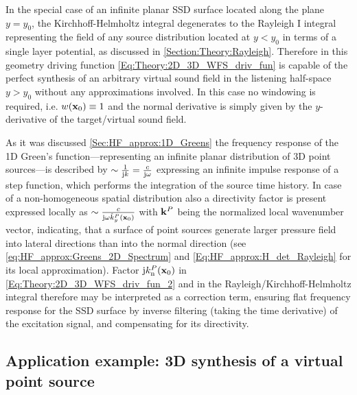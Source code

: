 \vspace{3mm}
In the special case of an infinite planar SSD surface located along the plane $y = y_0$, the Kirchhoff-Helmholtz integral degenerates to the Rayleigh I integral representing the field of any source distribution located at $y<y_0$ in terms of a single layer potential, as discussed in \ref{Section:Theory:Rayleigh}.
Therefore in this geometry driving function \eqref{Eq:Theory:2D_3D_WFS_driv_fun} is capable of the perfect synthesis of an arbitrary virtual sound field in the listening half-space $y>y_0$ without any approximations involved.
In this case no windowing is required, i.e. $w(\mathbf{x}_0) \equiv 1$ and the normal derivative is simply given by the $y$-derivative of the target/virtual sound field.

As it was discussed \ref{Sec:HF_approx:1D_Greens} the frequency response of the 1D Green's function---representing an infinite planar distribution of 3D point sources---is described by $\sim \frac{1}{\mathrm{j} k} = \frac{c}{\mathrm{j} \omega}$ expressing an infinite impulse response of a step function, which performs the integration of the source time history. 
In case of a non-homogeneous spatial distribution also a directivity factor is present expressed locally as $\sim \frac{c}{\mathrm{j} \omega \hat{k}^P_y(\mathbf{x}_0)}$ with $\mathbf{k}^P$ being the normalized local wavenumber vector, indicating, that a surface of point sources generate larger pressure field into lateral directions than into the normal direction (see \eqref{eq:HF_approx:Greens_2D_Spectrum} and \eqref{Eq:HF_approx:H_det_Rayleigh} for its local approximation).
Factor $\mathrm{j} k_{\mathrm{n}}^P(\mathbf{x}_0)$ in \eqref{Eq:Theory:2D_3D_WFS_driv_fun_2} and in the Rayleigh/Kirchhoff-Helmholtz integral therefore may be interpreted as a correction term, ensuring flat frequency response for the SSD surface by inverse filtering (taking the time derivative) of the excitation signal, and compensating for its directivity.

\subsection*{Application example: 3D synthesis of a virtual point source}

